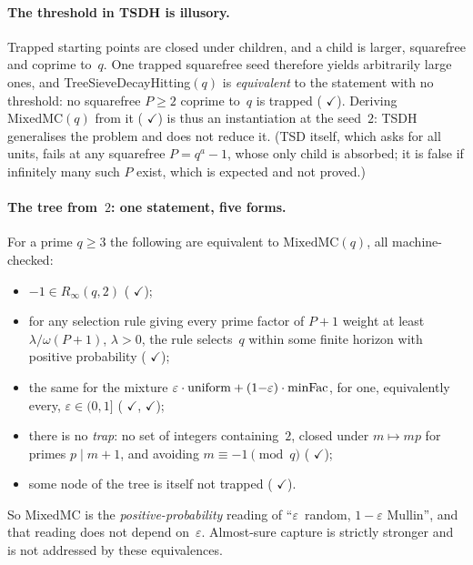 \paragraph{The threshold in TSDH is illusory.}
Trapped starting points are closed under children, and a child is
larger, squarefree and coprime to~$q$.  One trapped squarefree seed
therefore yields arbitrarily large ones, and
TreeSieveDecayHitting$(q)$ is \emph{equivalent} to the statement with
no threshold: no squarefree $P \geq 2$ coprime to~$q$ is trapped
(
{\color{leanink}$\checkmark$}).
Deriving $\mathrm{MixedMC}(q)$ from it
(
{\color{leanink}$\checkmark$})
is thus an instantiation at the seed~$2$: TSDH generalises the problem
and does not reduce it.  (TSD itself, which asks for all units, fails
at any squarefree $P = q^a - 1$, whose only child is absorbed; it is
false if infinitely many such $P$ exist, which is expected and not
proved.)

\paragraph{The tree from~$2$: one statement, five forms.}
For a prime $q \geq 3$ the following are equivalent to
$\mathrm{MixedMC}(q)$, all machine-checked:
\begin{itemize}
\item $-1 \in R_\infty(q,2)$
  ( {\color{leanink}$\checkmark$});
\item for any selection rule giving every prime factor of $P{+}1$
  weight at least $\lambda/\omega(P{+}1)$, $\lambda > 0$, the rule
  selects~$q$ within some finite horizon with positive probability
  ( {\color{leanink}$\checkmark$});
\item the same for the mixture
  $\varepsilon\cdot\text{uniform} + (1{-}\varepsilon)\cdot\mathrm{minFac}$,
  for one, equivalently every, $\varepsilon \in (0,1]$
  ( {\color{leanink}$\checkmark$},  {\color{leanink}$\checkmark$});
\item there is no \emph{trap}: no set of integers containing~$2$,
  closed under $m \mapsto mp$ for primes $p \mid m{+}1$, and avoiding
  $m \equiv -1 \pmod q$
  ( {\color{leanink}$\checkmark$});
\item some node of the tree is itself not trapped
  ( {\color{leanink}$\checkmark$}).
\end{itemize}
So $\mathrm{MixedMC}$ is the \emph{positive-probability} reading of
``$\varepsilon$~random, $1{-}\varepsilon$ Mullin'', and that reading
does not depend on~$\varepsilon$.  Almost-sure capture is strictly
stronger and is not addressed by these equivalences.

